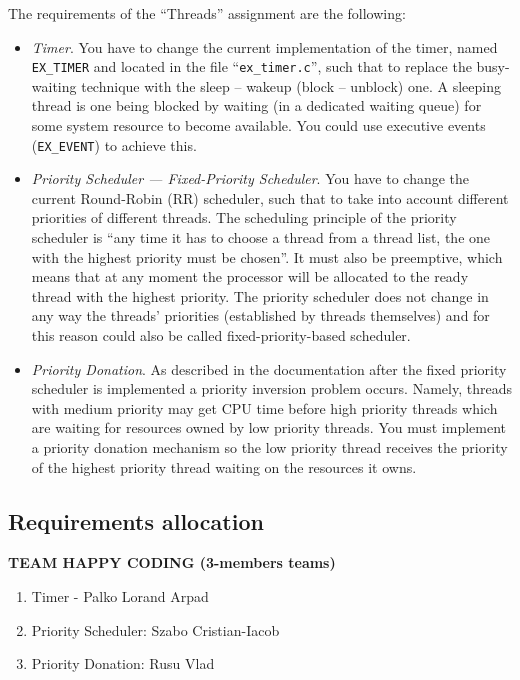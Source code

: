\documentclass{report}
\begin{document}
The requirements of the ``Threads'' assignment are the following:
\begin{enumerate}
	\begin{itemize}
		\item \textit{Timer}. You have to change the current implementation of the timer, named \texttt{EX\_TIMER} and located in the file ``\texttt{ex\_timer.c}'', such that to replace the busy-waiting technique with the sleep -- wakeup (block -- unblock) one. A sleeping thread is one being blocked by waiting (in a dedicated waiting queue) for some system resource to become available. You could use executive events (\texttt{EX\_EVENT}) to achieve this.
		
		\item \textit{Priority Scheduler --- Fixed-Priority Scheduler}. You have to change the current Round-Robin (RR) scheduler, such that to take into account different priorities of different threads. The scheduling principle of the priority scheduler is ``any time it has to choose a thread from a thread list, the one with the highest priority must be chosen''. It must also be preemptive, which means that at any moment the processor will be allocated to the ready thread with the highest priority. The priority scheduler does not change in any way the threads' priorities (established by threads themselves) and for this reason could also be called fixed-priority-based scheduler. 

		\item \textit{Priority Donation}. As described in the \OSName{} documentation after the fixed priority scheduler is implemented a priority inversion problem occurs. Namely, threads with medium priority may get CPU time before high priority threads which are waiting for resources owned by low priority threads. You must implement a priority donation mechanism so the low priority thread receives the priority of the highest priority thread waiting on the resources it owns.
	\end{itemize}
\end{enumerate}

\subsection{Requirements allocation}
    \item \textbf{TEAM HAPPY CODING (3-members teams)}
        \begin{enumerate}
            \item Timer - Palko Lorand Arpad 
            \item Priority Scheduler: Szabo Cristian-Iacob
            \item Priority Donation: Rusu Vlad
        \end{enumerate}
\end{document}
